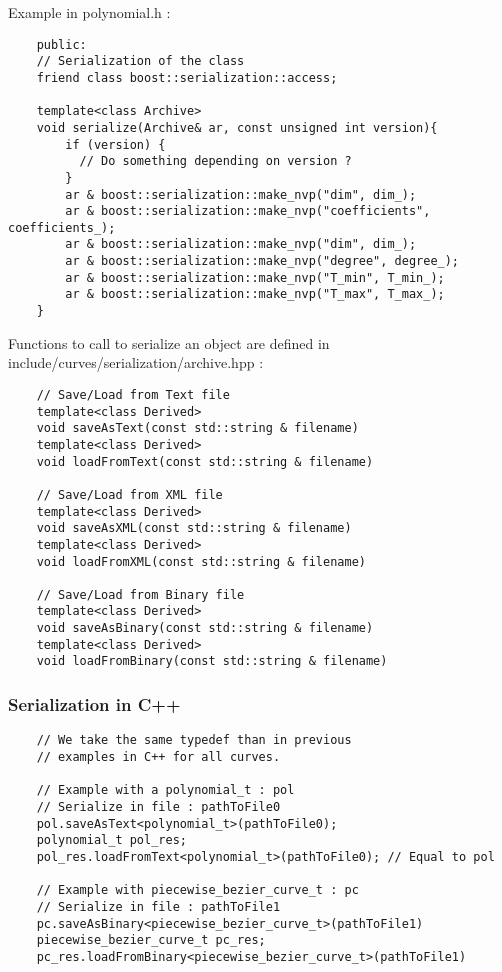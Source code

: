 \documentclass{article}
\begin{document}
    Example in polynomial.h :
    \begin{lstlisting}
    public:
    // Serialization of the class
    friend class boost::serialization::access;

    template<class Archive>
    void serialize(Archive& ar, const unsigned int version){
        if (version) {
          // Do something depending on version ?
        }
        ar & boost::serialization::make_nvp("dim", dim_);
        ar & boost::serialization::make_nvp("coefficients", coefficients_);
        ar & boost::serialization::make_nvp("dim", dim_);
        ar & boost::serialization::make_nvp("degree", degree_);
        ar & boost::serialization::make_nvp("T_min", T_min_);
        ar & boost::serialization::make_nvp("T_max", T_max_);
    }
    \end{lstlisting}

    Functions to call to serialize an object are defined in include/curves/serialization/archive.hpp :
    \begin{lstlisting}
    // Save/Load from Text file
    template<class Derived>
    void saveAsText(const std::string & filename)
    template<class Derived>
    void loadFromText(const std::string & filename)

    // Save/Load from XML file
    template<class Derived>
    void saveAsXML(const std::string & filename)
    template<class Derived>
    void loadFromXML(const std::string & filename)

    // Save/Load from Binary file
    template<class Derived>
    void saveAsBinary(const std::string & filename)
    template<class Derived>
    void loadFromBinary(const std::string & filename)
    \end{lstlisting}

    \subsubsection{Serialization in C++}
    \begin{lstlisting}
    // We take the same typedef than in previous
    // examples in C++ for all curves.

    // Example with a polynomial_t : pol
    // Serialize in file : pathToFile0
    pol.saveAsText<polynomial_t>(pathToFile0);
    polynomial_t pol_res;
    pol_res.loadFromText<polynomial_t>(pathToFile0); // Equal to pol

    // Example with piecewise_bezier_curve_t : pc
    // Serialize in file : pathToFile1
    pc.saveAsBinary<piecewise_bezier_curve_t>(pathToFile1)
    piecewise_bezier_curve_t pc_res;
    pc_res.loadFromBinary<piecewise_bezier_curve_t>(pathToFile1)
    \end{lstlisting}
\end{document}

